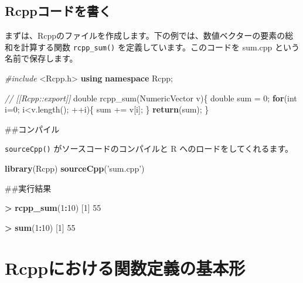 \documentclass[]{book}
\newenvironment{Shaded}{\begin{snugshade}}{\end{snugshade}}
\newcommand{\CommentTok}[1]{\textcolor[rgb]{0.56,0.35,0.01}{\textit{#1}}}
\newcommand{\ControlFlowTok}[1]{\textcolor[rgb]{0.13,0.29,0.53}{\textbf{#1}}}
\newcommand{\DataTypeTok}[1]{\textcolor[rgb]{0.13,0.29,0.53}{#1}}
\newcommand{\DecValTok}[1]{\textcolor[rgb]{0.00,0.00,0.81}{#1}}
\newcommand{\ImportTok}[1]{#1}
\newcommand{\KeywordTok}[1]{\textcolor[rgb]{0.13,0.29,0.53}{\textbf{#1}}}
\newcommand{\NormalTok}[1]{#1}
\newcommand{\OperatorTok}[1]{\textcolor[rgb]{0.81,0.36,0.00}{\textbf{#1}}}
\newcommand{\PreprocessorTok}[1]{\textcolor[rgb]{0.56,0.35,0.01}{\textit{#1}}}
\newcommand{\StringTok}[1]{\textcolor[rgb]{0.31,0.60,0.02}{#1}}
\begin{document}
\hypertarget{rcpp}{%
\section{Rcppコードを書く}\label{rcpp}}

まずは、Rcppのファイルを作成します。下の例では、数値ベクターの要素の総和を計算する関数 \texttt{rcpp\_sum()} を定義しています。このコードを sum.cpp という名前で保存します。

\begin{Shaded}
\begin{Highlighting}[]
\PreprocessorTok{#include }\ImportTok{<Rcpp.h>}
\KeywordTok{using} \KeywordTok{namespace}\NormalTok{ Rcpp;}

\CommentTok{// [[Rcpp::export]]}
\DataTypeTok{double}\NormalTok{ rcpp_sum(NumericVector v)\{}
    \DataTypeTok{double}\NormalTok{ sum = }\DecValTok{0}\NormalTok{;}
    \ControlFlowTok{for}\NormalTok{(}\DataTypeTok{int}\NormalTok{ i=}\DecValTok{0}\NormalTok{; i<v.length(); ++i)\{}
\NormalTok{        sum += v[i];}
\NormalTok{    \}}
    \ControlFlowTok{return}\NormalTok{(sum);}
\NormalTok{\}}
\end{Highlighting}
\end{Shaded}

\#\#コンパイル

\texttt{sourceCpp()} がソースコードのコンパイルと R へのロードをしてくれるます。

\begin{Shaded}
\begin{Highlighting}[]
\KeywordTok{library}\NormalTok{(Rcpp)}
\KeywordTok{sourceCpp}\NormalTok{(}\StringTok{'sum.cpp'}\NormalTok{)}
\end{Highlighting}
\end{Shaded}

\#\#実行結果

\begin{Shaded}
\begin{Highlighting}[]
\OperatorTok{>}\StringTok{ }\KeywordTok{rcpp_sum}\NormalTok{(}\DecValTok{1}\OperatorTok{:}\DecValTok{10}\NormalTok{)}
\NormalTok{[}\DecValTok{1}\NormalTok{] }\DecValTok{55}

\OperatorTok{>}\StringTok{ }\KeywordTok{sum}\NormalTok{(}\DecValTok{1}\OperatorTok{:}\DecValTok{10}\NormalTok{)}
\NormalTok{[}\DecValTok{1}\NormalTok{] }\DecValTok{55}
\end{Highlighting}
\end{Shaded}

\hypertarget{rcpp}{%
\chapter{Rcppにおける関数定義の基本形}\label{rcpp}}
\end{document}
